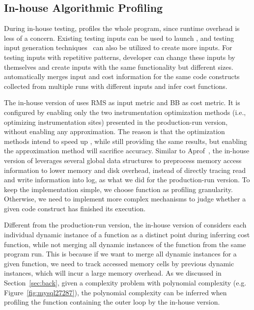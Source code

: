 \subsection{In-house Algorithmic Profiling}
\label{sec:in-house}

During in-house testing, \Tool profiles the whole program, 
since runtime overhead is less of a concern. 
Existing testing inputs can be used to launch \Tool, 
and testing input generation techniques~\cite{KLEE,dart,s2e} 
can also be utilized to create more inputs.
For testing inputs with repetitive patterns, 
developer can change these inputs by themselves 
and create inputs with the same functionality but different sizes. 
\Tool automatically merges input and cost information 
for the same code constructs
collected from multiple runs with different inputs and infer cost functions. 


The in-house version of \Tool uses RMS as input metric and BB
as cost metric.
It is configured by enabling
only the two instrumentation optimization methods (i.e.,
optimizing instrumentation sites) presented 
in the production-run version, without enabling any approximation. 
The reason is that the optimization methods intend to speed up \Tool, 
while still providing the same results, 
but enabling the approximation method will sacrifice accuracy. 
Similar to Aprof~\cite{Aprof1,Aprof2}, 
the in-house version of \Tool leverages several global data structures
to preprocess memory access information to lower memory and disk overhead,
instead of directly tracing read and write information into log, 
as what we did for the production-run version. 
To keep the implementation simple, 
we choose function as profiling granularity.
Otherwise, we need to implement more complex 
mechanisms to judge whether a given code construct 
has finished its execution.  

Different from the production-run version, the in-house version of \Tool 
considers each individual dynamic instance of a function 
as a distinct point during inferring cost function, 
while not merging all dynamic instances of the function 
from the same program run.
This is because if we want to merge all dynamic instances for a given function, 
we need to track accessed memory cells by previous dynamic instances, 
which will incur a large memory overhead. 
As we discussed in Section~\ref{sec:back}, 
given a complexity problem with polynomial complexity 
(e.g. Figure~\ref{fig:mysql27287}),  
the polynomial complexity can be inferred when profiling 
the function containing the outer loop by the in-house version.

